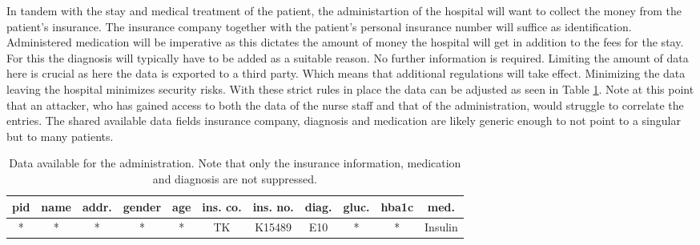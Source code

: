 In tandem with the stay and medical treatment of the patient, the administartion of the hospital will want to collect the money from the patient's insurance. The insurance company together with the patient's personal insurance number will suffice as identification. 
Administered medication will be imperative as this dictates the amount of money the hospital will get in addition to the fees for the stay. For this the diagnosis will typically have to be added as a suitable reason. No further information is required. Limiting the amount of data here 
is crucial as here the data is exported to a third party. Which means that additional regulations will take effect. Minimizing the data leaving the hospital minimizes security risks. With these strict rules in place the data can be adjusted as seen in Table \ref{table:administration}. \newline 
Note at this point that an attacker, who has gained access to both the data of the nurse staff and that of the administration, would struggle to correlate the entries. The shared available data fields insurance company, diagnosis and medication are likely generic enough to not point to a singular but to many patients. 

\bigskip

\begin{table}[ht]
    \begin{center}
    \footnotesize{
        \renewcommand{\arraystretch}{1.5}
        \begin{tabular}{ | c | c | c | c | c | c | c | c | c | c | c | } 
            \hline
            pid & name & addr. & gender & age & ins. co. & ins. no. & diag. & gluc. & hba1c & med. \\
            \hline
            * & * & * & * & * & TK & K15489 & E10 & * & * & Insulin \\
            \hline
        \end{tabular}
    }
    \caption{Data available for the administration. Note that only the insurance information, medication and diagnosis are not suppressed.}
    \label{table:administration}
    \end{center}
\end{table}

